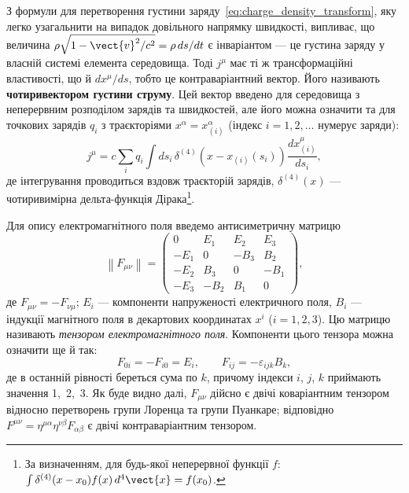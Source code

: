 З формули для перетворення густини заряду~\eqref{eq:charge_density_transform}, яку легко узагальнити на випадок довільного напрямку швидкості, випливає, що величина $\rho\sqrt{1-\vect{v}^{2}/c^{2}} = \rho\,ds/dt$ є інваріантом --- це густина заряду у власній системі елемента середовища. Тоді $j^{\mu}$ має ті ж трансформаційні властивості, що й $dx^{\mu}/ds$, тобто це контраваріантний вектор. Його називають \textbf{чотиривектором густини струму}. Цей вектор введено для середовища з неперервним розподілом зарядів та швидкостей, але його можна означити та для точкових зарядів $q_{i}$ з траєкторіями $x^{\alpha}=x^{\alpha}_{(i)}$ (індекс $i=1,2,\ldots$ нумерує заряди):
\begin{equation*}
    j^{\mu} = c\sum_{i}q_{i}\int ds_{i}\,\delta^{(4)}(x - x_{(i)}(s_{i}))
    \frac{dx_{(i)}^{\mu}}{ds_{i}},
\end{equation*}
де інтегрування проводиться вздовж траєкторій зарядів, $\delta^{(4)}(x)$ --- чотиривимірна дельта-функція Дірака\footnote{За визначенням, для будь-якої неперервної функції $f$: $\int\delta^{(4)}(x-x_0)f(x)\,d^4\vect{x} = f(x_0)$.}.

Для опису електромагнітного поля введемо антисиметричну матрицю
\begin{equation*}
\left\| F_{\mu\nu} \right\| =
\begin{pmatrix}
0 & E_1 & E_2 & E_3 \\
-E_1 & 0 & -B_3 & B_2 \\
-E_2 & B_3 & 0 & -B_1 \\
-E_3 & -B_2 & B_1 & 0
\end{pmatrix},
\end{equation*}
де $F_{\mu\nu}=-F_{\nu\mu}$; $E_i$ --- компоненти напруженості електричного поля, $B_i$ --- індукції магнітного поля в декартових координатах $x^{i}$ ($i=1,2,3$). Цю матрицю називають \emph{тензором електромагнітного поля}. Компоненти цього тензора можна означити ще й так:
\begin{equation*}
    F_{0i} = -F_{i0} = E_i, \qquad F_{ij} = -\varepsilon_{ijk}B_k,
\end{equation*}
де в останній рівності береться сума по $k$, причому індекси $i$, $j$, $k$ приймають значення 1,~2,~3. Як буде видно далі, $F_{\mu\nu}$ дійсно є двічі коваріантним тензором відносно перетворень групи Лоренца та групи Пуанкаре; відповідно $F^{\mu\nu}=\eta^{\mu\alpha}\eta^{\nu\beta}F_{\alpha\beta}$ є двічі контраваріантним тензором.

